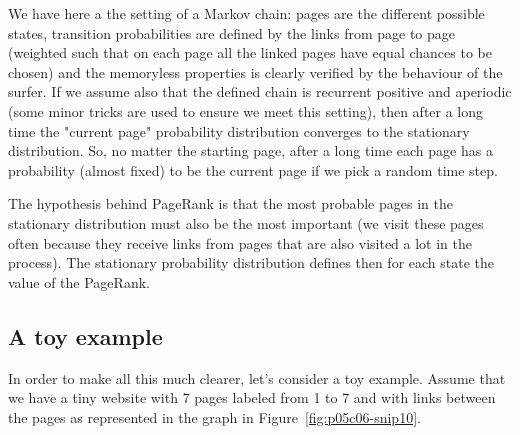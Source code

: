 We have here a the setting of a Markov chain: pages are the different possible states, transition probabilities are defined by the links from page to page (weighted such that on each page all the linked pages have equal chances to be chosen) and the memoryless properties is clearly verified by the behaviour of the surfer. If we assume also that the defined chain is recurrent positive and aperiodic (some minor tricks are used to ensure we meet this setting), then after a long time the "current page" probability distribution converges to the stationary distribution. So, no matter the starting page, after a long time each page has a probability (almost fixed) to be the current page if we pick a random time step.

The hypothesis behind PageRank is that the most probable pages in the stationary distribution must also be the most important (we visit these pages often because they receive links from pages that are also visited a lot in the process). The stationary probability distribution defines then for each state the value of the PageRank.

\subsection{A toy example}

In order to make all this much clearer, let's consider a toy example. Assume that we have a tiny website with 7 pages labeled from 1 to 7 and with links between the pages as represented in the graph in Figure~\ref{fig:p05c06-snip10}.


